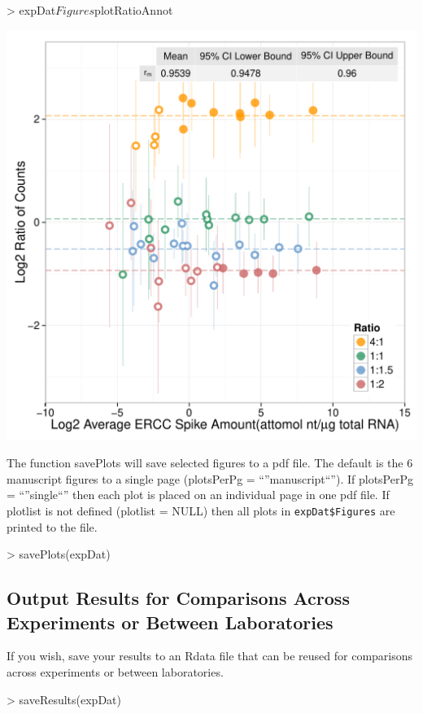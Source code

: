 \documentclass{article}
\begin{document}
\clearpage
\begin{center}
\begin{Schunk}
\begin{Sinput}
> expDat$Figures$plotRatioAnnot
\end{Sinput}
\end{Schunk}
\includegraphics{erccdashboardVignette-printPanelF}
\end{center}
\clearpage
The function savePlots will save selected figures to a pdf file. The default is
the 6 manuscript figures to a single page (plotsPerPg = ``''manuscript``''). If 
plotsPerPg = ``''single``'' then each plot is placed on an individual page in one pdf 
file. If plotlist is not defined (plotlist = NULL) then all plots in 
\verb|expDat$Figures| are printed to the file.
\begin{Schunk}
\begin{Sinput}
> savePlots(expDat)
\end{Sinput}
\end{Schunk}

\subsection{Output Results for Comparisons Across Experiments or Between 
Laboratories}
If you wish, save your results to an Rdata file that can be reused for
comparisons across experiments or between laboratories.
\begin{Schunk}
\begin{Sinput}
> saveResults(expDat)
\end{Sinput}
\end{Schunk}
\end{document}
